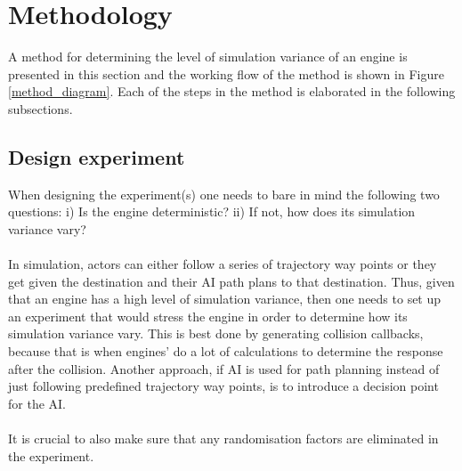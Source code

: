 \section{Methodology} \label{method}
\noindent A method for determining the level of simulation variance of an engine is presented in this section and the working flow of the method is shown in Figure \ref{method_diagram}. Each of the steps in the method is elaborated in the following subsections.

\subsection{Design experiment}
\noindent When designing the experiment(s) one needs to bare in mind the following two questions: i) Is the engine deterministic? ii) If not, how does its simulation variance vary?\\\\
In simulation, actors can either follow a series of trajectory way points or they get given the destination and their AI path plans to that destination. 
Thus, given that an engine has a high level of simulation variance, then one needs to set up an experiment that would stress the engine in order to determine how its simulation variance vary. 
This is best done by generating collision callbacks, because that is when engines' do a lot of calculations to determine the response after the collision. Another approach, if AI is used for path planning instead of just following predefined trajectory way points, is to introduce a decision point for the AI.\\\\
It is crucial to also make sure that any randomisation factors are eliminated in the experiment.

